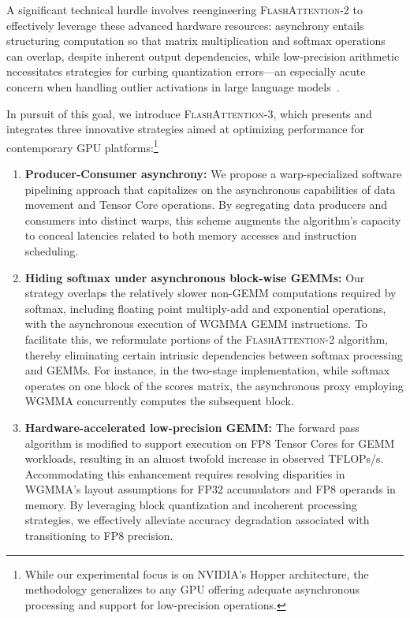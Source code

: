 A significant technical hurdle involves reengineering \textsc{FlashAttention-2} to effectively leverage these advanced hardware resources: asynchrony entails structuring computation so that matrix multiplication and softmax operations can overlap, despite inherent output dependencies, while low-precision arithmetic necessitates strategies for curbing quantization errors—an especially acute concern when handling outlier activations in large language models~\citep{dettmers2208llm, sun2024massive}.

In pursuit of this goal, we introduce \textsc{FlashAttention-3}, which presents and integrates three innovative strategies aimed at optimizing performance for contemporary GPU platforms:\footnote{While our experimental focus is on NVIDIA's Hopper architecture, the methodology generalizes to any GPU offering adequate asynchronous processing and support for low-precision operations.}

\begin{enumerate}

\item \textbf{Producer-Consumer asynchrony:} We propose a warp-specialized software pipelining approach that capitalizes on the asynchronous capabilities of data movement and Tensor Core operations. By segregating data producers and consumers into distinct warps, this scheme augments the algorithm’s capacity to conceal latencies related to both memory accesses and instruction scheduling.

\item \textbf{Hiding softmax under asynchronous block-wise GEMMs:} Our strategy overlaps the relatively slower non-GEMM computations required by softmax, including floating point multiply-add and exponential operations, with the asynchronous execution of WGMMA GEMM instructions. To facilitate this, we reformulate portions of the \textsc{FlashAttention-2} algorithm, thereby eliminating certain intrinsic dependencies between softmax processing and GEMMs. For instance, in the two-stage implementation, while softmax operates on one block of the scores matrix, the asynchronous proxy employing WGMMA concurrently computes the subsequent block.

\item \textbf{Hardware-accelerated low-precision GEMM:} The forward pass algorithm is modified to support execution on FP8 Tensor Cores for GEMM workloads, resulting in an almost twofold increase in observed TFLOPs/s. Accommodating this enhancement requires resolving disparities in WGMMA’s layout assumptions for FP32 accumulators and FP8 operands in memory. By leveraging block quantization and incoherent processing strategies, we effectively alleviate accuracy degradation associated with transitioning to FP8 precision.
\end{enumerate}

